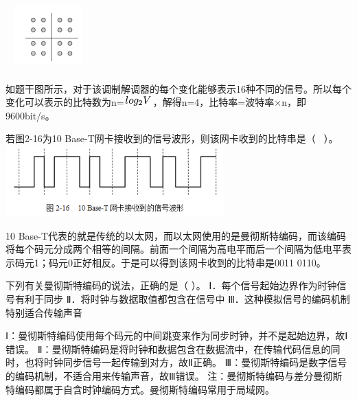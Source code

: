 ~
\includegraphics[width=1.04167in,height=1.04167in]{computerassets/B4EF6AF3A7F2C9C0FE3B7D8F48920A13.png}
\par{}
\begin{solution}如题干图所示，对于该调制解调器的每个变化能够表示16种不同的信号。所以每个变化可以表示的比特数为n=\includegraphics[width=0.43750in,height=0.14583in]{texmath/59cdc05Cdpi7B3507Dlog_2V}，解得n=4，比特率=波特率×n，即9600bit/s。
\end{solution}
\question 若图2-16为10 Base-T网卡接收到的信号波形，则该网卡收到的比特串是（ ~）。
\includegraphics[width=3.33333in,height=1.07292in]{computerassets/3FAE39CB101AFF3BB8DBABF6F9D0CF6B.png}
\par{}
\begin{solution}10
Base-T代表的就是传统的以太网，而以太网使用的是曼彻斯特编码，而该编码将每个码元分成两个相等的间隔。前面一个间隔为高电平而后一个间隔为低电平表示码元1；码元0正好相反。于是可以得到该网卡收到的比特串是0011
0110。
\end{solution}
\question 下列有关曼彻斯特编码的说法，正确的是（ ）。
Ⅰ．每个信号起始边界作为时钟信号有利于同步
Ⅱ．将时钟与数据取值都包含在信号中
Ⅲ．这种模拟信号的编码机制特别适合传输声音
\par{}
\begin{solution}Ⅰ：曼彻斯特编码使用每个码元的中间跳变来作为同步时钟，并不是起始边界，故Ⅰ错误。
Ⅱ：曼彻斯特编码是将时钟和数据包含在数据流中，在传输代码信息的同时，也将时钟同步信号一起传输到对方，故Ⅱ正确。
Ⅲ：曼彻斯特编码是数字信号的编码机制，不适合用来传输声音，故Ⅲ错误。
注：曼彻斯特编码与差分曼彻斯特编码都属于自含时钟编码方式。曼彻斯特编码常用于局域网。
\end{solution}
